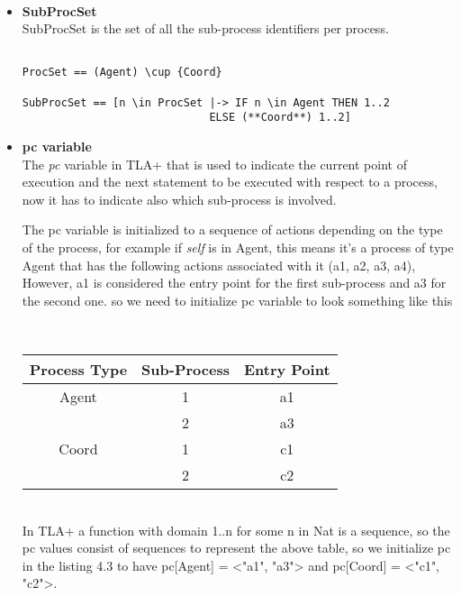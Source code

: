 \documentclass{thesul}
\begin{document}
\hfill\\
\begin{itemize}

\item \textbf{SubProcSet}
\hfill\\

SubProcSet is the set of all the sub-process identifiers per process.

\begin{lstlisting}[caption = TLA+ translation for Sub-Processes, frame = tlrb, firstnumber = 1]

ProcSet == (Agent) \cup {Coord}

SubProcSet == [n \in ProcSet |-> IF n \in Agent THEN 1..2
                             ELSE (**Coord**) 1..2]

\end{lstlisting}

\item \textbf{pc variable}
\hfill\\

The \textit{pc} variable in TLA+ that is used to indicate the current point of execution and the next statement to be executed with respect to a process, now it has to indicate also which sub-process is involved.
 	
The pc variable is initialized to a sequence of actions depending on the type of the process, for example if \textit{self} is in Agent, this means it's a process of type Agent that has the following actions associated with it (a1, a2, a3, a4), However, a1 is considered the entry point for the first sub-process and a3 for the second one. so we need to initialize pc variable to look something like this

\hfill\\
\begin{center}
\begin{tabular}{ |c|c|c| } 
\hline
\textbf{Process Type} & \textbf{Sub-Process} & \textbf{Entry Point} \\
\hline
Agent & 1 & a1 \\ 
		& 2 & a3 \\ 
\hline
Coord & 1 & c1 \\ 
	  & 2 & c2 \\ 
\hline
\end{tabular}
\end{center}

\hfill\\

In TLA+ a function with domain 1..n for some n in Nat is a sequence, so the pc values consist of sequences to represent the above table, so we initialize pc in the listing 4.3 to have pc[Agent] = <"a1", "a3"> and pc[Coord] = <"c1", "c2">.


\end{itemize}
\end{document}
